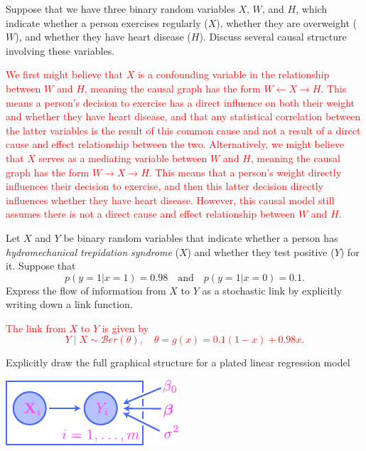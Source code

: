 \documentclass[12pt,reqno]{amsart}
\begin{document}
\bigskip

\prob Suppose that we have three binary random variables $X$, $W$, and $H$, which indicate whether a person exercises regularly ($X$), whether they are overweight ($W$), and whether they have heart disease ($H$). Discuss several causal structure involving these variables.

\bigskip
\textcolor{red}{We first might believe that $X$ is a confounding variable in the relationship between $W$ and $H$, meaning the causal graph has the form $W \leftarrow X \rightarrow H$. This means a person's decision to exercise has a direct influence on both their weight and whether they have heart disease, and that any statistical correlation between the latter variables is the result of this common cause and not a result of a direct cause and effect relationship between the two. Alternatively, we might believe that $X$ serves as a mediating variable between $W$ and $H$, meaning the causal graph has the form $W \to X \to H$. This means that a person's weight directly influences their decision to exercise, and then this latter decision directly influences whether they have heart disease. However, this causal model still assumes there is not a direct cause and effect relationship between $W$ and $H$.}
\bigskip













\prob Let $X$ and $Y$ be binary random variables that indicate whether a person has \textit{hydromechanical trepidation syndrome} ($X$) and whether they test positive ($Y$) for it. Suppose that
	\[p(y=1 |x=1) = 0.98 \quad \text{and} \quad p(y=1 | x=0) = 0.1.
	\]
Express the flow of information from $X$ to $Y$ as a stochastic link by explicitly writing down a link function.

\bigskip
\textcolor{red}{The link from $X$ to $Y$ is given by
	\[Y \mid X \sim \mathcal{B}er(\theta), \quad \theta = g(x) = 0.1(1-x) + 0.98x.
	\]}
\bigskip
	







\prob Explicitly draw the full graphical structure for a plated linear regression model

\bigskip
\begin{center}
\includegraphics[scale=1.5]{lin-reg-00-plated.pdf}
\end{center}
\bigskip
\end{document}
